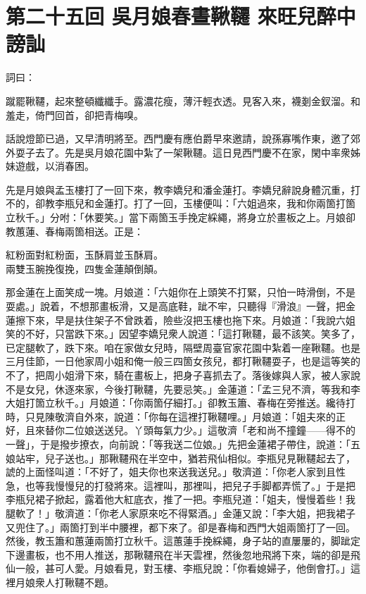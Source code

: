 
\chapter*{第二十五回 吳月娘春晝鞦韆 來旺兒醉中謗訕}


詞曰：

\begin{myquote} 
蹴罷鞦韆，起來整頓纖纖手。露濃花瘦，薄汗輕衣透。見客入來，襪剗金釵溜。和羞走，倚門回首，卻把青梅嗅。

\end{myquote} 

話說燈節已過，又早清明將至。西門慶有應伯爵早來邀請，說孫寡嘴作東，邀了郊外耍子去了。先是吳月娘花園中紮了一架鞦韆。這日見西門慶不在家，閑中率衆姊妹遊戲，以消春困。

先是月娘與孟玉樓打了一回下來，教李嬌兒和潘金蓮打。李嬌兒辭說身體沉重，打不的，卻教李瓶兒和金蓮打。打了一回，玉樓便叫：「六姐過來，我和你兩箇打箇立秋千。」分咐：「休要笑。」當下兩箇玉手挽定綵繩，將身立於畫板之上。月娘卻教蕙蓮、春梅兩箇相送。正是：

\begin{myquote}
紅粉面對紅粉面，玉酥肩並玉酥肩。\\兩雙玉腕挽復挽，四隻金蓮顛倒顛。
\end{myquote}

那金蓮在上面笑成一塊。{}月娘道：「六姐你在上頭笑不打緊，只怕一時滑倒，不是耍處。」說着，不想那畫板滑，又是高底鞋，跐不牢，只聽得『滑浪』一聲，把金蓮擦下來，{}早是扶住架子不曾跌着，險些沒把玉樓也拖下來。月娘道：「我說六姐笑的不好，只當跌下來。」{}因望李嬌兒衆人說道：「這打鞦韆，最不該笑。笑多了，已定腿軟了，跌下來。咱在家做女兒時，隔壁周臺官家花園中紮着一座鞦韆。也是三月佳節，一日他家周小姐和俺一般三四箇女孩兒，都打鞦韆耍子，也是這等笑的不了，把周小姐滑下來，騎在畫板上，把身子喜抓去了。落後嫁與人家，被人家說不是女兒，休逐來家，今後打鞦韆，先要忌笑。」金蓮道：「孟三兒不濟，{}等我和李大姐打箇立秋千。」月娘道：「你兩箇仔細打。」卻教玉簫、春梅在旁推送。纔待打時，只見陳敬濟自外來，說道：「你每在這裡打鞦韆哩。」月娘道：「姐夫來的正好，且來替你二位娘送送兒。丫頭每氣力少。」這敬濟「老和尚不撞鐘——得不的一聲」，于是撥步撩衣，向前說：「等我送二位娘。」先把金蓮裙子帶住，說道：「五娘站牢，兒子送也。」那鞦韆飛在半空中，猶若飛仙相似。李瓶兒見鞦韆起去了，諕的上面怪叫道：「不好了，姐夫你也來送我送兒。」敬濟道：「你老人家到且性急，也等我慢慢兒的打發將來。這裡叫，那裡叫，把兒子手脚都弄慌了。」于是把李瓶兒裙子掀起，露着他大紅底衣，推了一把。李瓶兒道：「姐夫，慢慢着些！我腿軟了！」敬濟道：「你老人家原來吃不得緊酒。」金蓮又說：「李大姐，把我裙子又兜住了。」兩箇打到半中腰裡，都下來了。卻是春梅和西門大姐兩箇打了一回。然後，教玉簫和蕙蓮兩箇打立秋千。這蕙蓮手挽綵繩，身子站的直屢屢的，脚跐定下邊畫板，也不用人推送，那鞦韆飛在半天雲裡，然後忽地飛將下來，端的卻是飛仙一般，甚可人愛。{}月娘看見，對玉樓、李瓶兒說：「你看媳婦子，他倒會打。」這裡月娘衆人打鞦韆不題。

